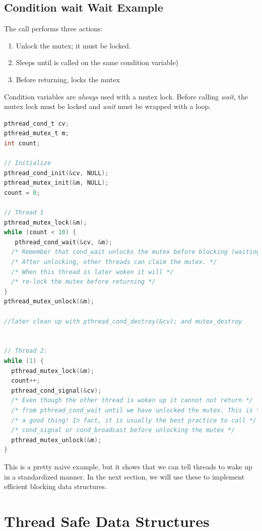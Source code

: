 \subsection{Condition wait Wait Example}

The call  performs three actions:

\begin{enumerate}
\item Unlock the mutex; it must be locked.
\item Sleeps until  is called on the same condition variable)
\item Before returning, locks the mutex
\end{enumerate}

Condition variables are \emph{always} used with a mutex lock.
Before calling \emph{wait}, the mutex lock must be locked and \emph{wait} must be wrapped with a loop.

\begin{lstlisting}[language=C]
pthread_cond_t cv;
pthread_mutex_t m;
int count;

// Initialize
pthread_cond_init(&cv, NULL);
pthread_mutex_init(&m, NULL);
count = 0;

// Thread 1
pthread_mutex_lock(&m);
while (count < 10) {
   pthread_cond_wait(&cv, &m);
  /* Remember that cond_wait unlocks the mutex before blocking (waiting)! */
  /* After unlocking, other threads can claim the mutex. */
  /* When this thread is later woken it will */
  /* re-lock the mutex before returning */
}
pthread_mutex_unlock(&m);

//later clean up with pthread_cond_destroy(&cv); and mutex_destroy


// Thread 2:
while (1) {
  pthread_mutex_lock(&m);
  count++;
  pthread_cond_signal(&cv);
  /* Even though the other thread is woken up it cannot not return */
  /* from pthread_cond_wait until we have unlocked the mutex. This is */
  /* a good thing! In fact, it is usually the best practice to call */
  /* cond_signal or cond_broadcast before unlocking the mutex */
  pthread_mutex_unlock(&m);
}
\end{lstlisting}

This is a pretty naive example, but it shows that we can tell threads to wake up in a standardized manner. In the next section, we will use these to implement efficient blocking data structures.

\section{Thread Safe Data Structures}


